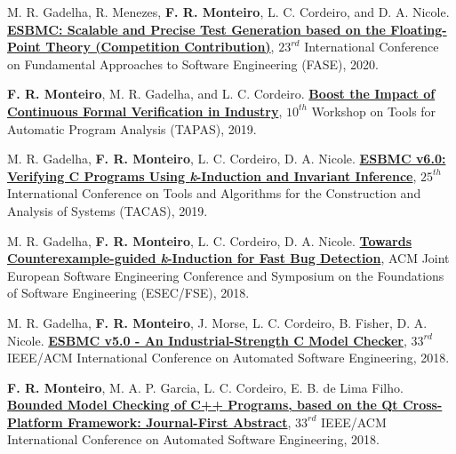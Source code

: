 \documentclass[letterpaper]{article}
\renewenvironment{itemize}{
  \begin{list}{}{
    \setlength{\leftmargin}{1.5em}
  }
}{
  \end{list}
}
\begin{document}
\begin{itemize}
    \item M. R. Gadelha, R. Menezes, {\bf F. R. Monteiro}, L. C. Cordeiro, and D. A. Nicole. \href{https://test-comp.sosy-lab.org/2020/}{{\bf ESBMC: Scalable and Precise Test Generation based on the Floating-Point Theory (Competition Contribution)}},
   $23^{rd}$ International Conference on Fundamental Approaches to Software Engineering (FASE), 2020.
 
    \item {\bf F. R. Monteiro}, M. R. Gadelha, and L. C. Cordeiro. \href{https://staticanalysis.org/tapas2019/talks/tapas19-pre.pdf}{{\bf Boost the Impact of Continuous Formal Verification in Industry}},
   $10^{th}$ Workshop on Tools for Automatic Program Analysis (TAPAS), 2019.
 
    \item M. R. Gadelha, {\bf F. R. Monteiro}, L. C. Cordeiro, D. A. Nicole. \href{https://link.springer.com/chapter/10.1007/978-3-030-17502-3_15}{{\bf ESBMC v6.0: Verifying C Programs Using {\emph k}-Induction and Invariant Inference}},
   $25^{th}$ International Conference on Tools and Algorithms for the Construction and Analysis of Systems (TACAS), 2019.
   
    \item M. R. Gadelha, {\bf F. R. Monteiro}, L. C. Cordeiro, D. A. Nicole. \href{https://ssvlab.github.io/lucasccordeiro/papers/fse2018.pdf}{{\bf Towards Counterexample-guided {\emph k}-Induction for Fast Bug Detection}},
   ACM Joint European Software Engineering Conference and Symposium on the Foundations of Software Engineering (ESEC/FSE), 2018.
  
    \item M. R. Gadelha, {\bf F. R. Monteiro}, J. Morse, L. C. Cordeiro, B. Fisher, D. A. Nicole. \href{https://ssvlab.github.io/lucasccordeiro/papers/ase2018.pdf}{{\bf ESBMC v5.0 - An Industrial-Strength C Model Checker}},
  $33^{rd}$ IEEE/ACM International Conference on Automated Software Engineering, 2018.  
        
    \item {\bf F. R. Monteiro}, M. A. P. Garcia, L. C. Cordeiro, E. B. de Lima Filho. \href{https://www.researchgate.net/publication/326657978_Bounded_Model_Checking_of_C_Programs_based_on_the_Qt_Cross-Platform_Framework_Journal-First_Abstract}{{\bf Bounded Model Checking of C++ Programs, based on the Qt Cross-Platform Framework: Journal-First Abstract}},
  $33^{rd}$ IEEE/ACM International Conference on Automated Software Engineering, 2018.  
  

\end{itemize}
\end{document}
